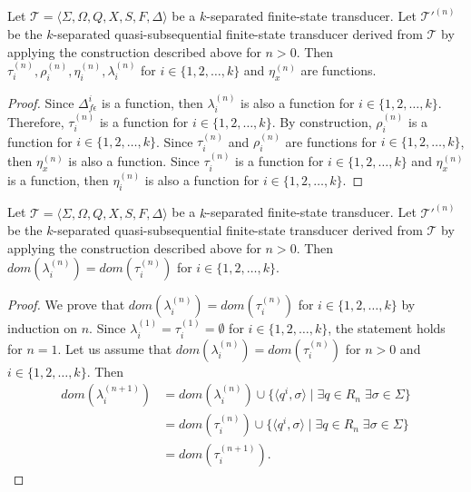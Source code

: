 \begin{proposition}
  Let $\mathcal{T} = \langle \Sigma, \Omega, Q, X, S, F, \Delta \rangle$ be a
  $k$-separated finite-state transducer. Let $\mathcal{T}'^{(n)}$ be the
  $k$-separated quasi-subsequential finite-state transducer derived from
  $\mathcal{T}$ by applying the construction described above for $n > 0$. Then
  $\tau_i^{(n)}, \rho_i^{(n)}, \eta_i^{(n)}, \lambda_i^{(n)}$ for $i \in \{ 1, 2,
  \ldots, k \}$ and $\eta_x^{(n)}$ are functions.
\end{proposition}

\begin{proof}
  Since $\Delta_{f\epsilon}^i$ is a function, then $\lambda_i^{(n)}$ is also a
  function for $i \in \{ 1, 2, \ldots, k \}$. Therefore, $\tau_i^{(n)}$ is a
  function for $i \in \{ 1, 2, \ldots, k \}$. By construction, $\rho_i^{(n)}$ is a
  function for $i \in \{ 1, 2, \ldots, k \}$. Since $\tau_i^{(n)}$ and
  $\rho_i^{(n)}$ are functions for $i \in \{ 1, 2, \ldots, k \}$, then
  $\eta_x^{(n)}$ is also a function. Since $\tau_i^{(n)}$ is a function for $i
  \in \{ 1, 2, \ldots, k \}$ and $\eta_x^{(n)}$ is a function, then $\eta_i^{(n)}$
  is also a function for $i \in \{ 1, 2, \ldots, k \}$.
\end{proof}

\begin{proposition}
  Let $\mathcal{T} = \langle \Sigma, \Omega, Q, X, S, F, \Delta \rangle$ be a
  $k$-separated finite-state transducer. Let $\mathcal{T}'^{(n)}$ be the
  $k$-separated quasi-subsequential finite-state transducer derived from
  $\mathcal{T}$ by applying the construction described above for $n > 0$. Then
  $dom(\lambda_i^{(n)}) = dom(\tau_i^{(n)})$ for $i \in \{ 1, 2, \ldots, k \}$.
\end{proposition}

\begin{proof}
  We prove that $dom(\lambda_i^{(n)}) = dom(\tau_i^{(n)})$ for $i \in \{ 1, 2,
  \ldots, k \}$ by induction on $n$. Since $\lambda_i^{(1)} = \tau_i^{(1)} =
  \emptyset$ for $i \in \{ 1, 2, \ldots, k \}$, the statement holds for $n = 1$. Let
  us assume that $dom(\lambda_i^{(n)}) = dom(\tau_i^{(n)})$ for $n > 0$ and $i \in \{
  1, 2, \ldots, k \}$. Then
  \begin{align*}
    dom(\lambda_i^{(n+1)}) & = dom(\lambda_i^{(n)}) \cup \{ \langle q^i, \sigma
    \rangle \mid \exists q \in R_n \; \exists \sigma \in \Sigma \}\\
                        & = dom(\tau_i^{(n)}) \cup \{ \langle q^i, \sigma
    \rangle \mid \exists q \in R_n \; \exists \sigma \in \Sigma \}\\
                        & = dom(\tau_i^{(n+1)}).
  \end{align*}
\end{proof}

